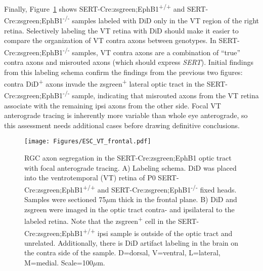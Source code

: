 Finally, Figure~\ref{ESCVTfrontal} shows SERT-Cre:zsgreen;EphB1\textsuperscript{+/+} and SERT-Cre:zsgreen;EphB1\textsuperscript{-/-} samples labeled with DiD only in the VT region of the right retina.
Selectively labeling the VT retina with DiD should make it easier to compare the organization of VT contra axons between genotypes.
In SERT-Cre:zsgreen;EphB1\textsuperscript{-/-} samples, VT contra axons are a combination of ``true'' contra axons and misrouted axons (which should express \emph{SERT}).
Initial findings from this labeling schema confirm the findings from the previous two figures: contra DiD\textsuperscript{+} axons invade the zsgreen\textsuperscript{+} lateral optic tract in the SERT-Cre:zsgreen;EphB1\textsuperscript{-/-} sample, indicating that misrouted axons from the VT retina associate with the remaining ipsi axons from the other side.
Focal VT anterograde tracing is inherently more variable than whole eye anterograde, so this assessment needs additional cases before drawing definitive conclusions.
\begin{figure}[hbtp]
    \begin{center}
        \texttt{[image: Figures/ESC\_VT\_frontal.pdf]}
        \caption[RGC axon segregation in the SERT-Cre:zsgreen;EphB1 optic tract with focal anterograde tracing.]
        {RGC axon segregation in the SERT-Cre:zsgreen;EphB1 optic tract with focal anterograde tracing.
        A) Labeling schema.
        DiD was placed into the ventrotemporal (VT) retina of P0 SERT-Cre:zsgreen;EphB1\textsuperscript{+/+} and SERT-Cre:zsgreen;EphB1\textsuperscript{-/-} fixed heads.
        Samples were sectioned 75$\mu$m thick in the frontal plane.
        B) DiD and zsgreen were imaged in the optic tract contra- and ipsilateral to the labeled retina.
        Note that the zsgreen\textsuperscript{+} cell in the SERT-Cre:zsgreen;EphB1\textsuperscript{+/+} ipsi sample is outside of the optic tract and unrelated.
        Additionally, there is DiD artifact labeling in the brain on the contra side of the sample.
        D=dorsal, V=ventral, L=lateral, M=medial.
        Scale=100$\mu$m.}
        \label{ESCVTfrontal}
    \end{center}
\end{figure}